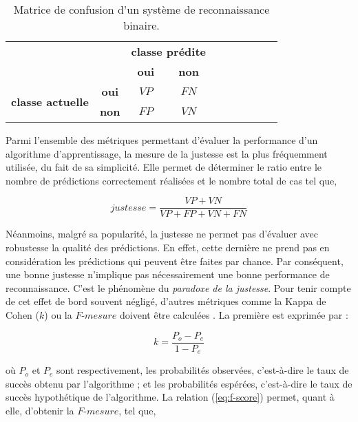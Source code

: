 \begin{table}[H]
	\begin{center}
		\caption{Matrice de confusion d'un système de reconnaissance binaire.}
		\label{tab:conf_mat}
		\begin{tabular}{llllllllll}
			\cline{3-4}
			& \multicolumn{1}{l|}{} & \multicolumn{2}{c|}{\textbf{classe prédite}} \\ \cline{3-4}
	        & \multicolumn{1}{l|}{} & \multicolumn{1}{c|}{\textbf{oui}} & \multicolumn{1}{c|}{\textbf{non}} \\ \cline{1-4}
			\multicolumn{1}{|c|}{\multirow{2}{*}{\textbf{classe actuelle}}} & \multicolumn{1}{c|}{\textbf{oui}} & \multicolumn{1}{c|}{$VP$} & \multicolumn{1}{c|}{$FN$} \\ \cline{2-4}
			\multicolumn{1}{|c|}{} & \multicolumn{1}{c|}{\textbf{non}} & \multicolumn{1}{c|}{$FP$} & \multicolumn{1}{c|}{$VN$} \\ \cline{1-4}
		\end{tabular}
	\end{center}
\end{table}

Parmi l'ensemble des métriques permettant d'évaluer la performance d'un algorithme d'apprentissage, la mesure de la justesse est la plus fréquemment utilisée, du fait de sa simplicité. Elle permet de déterminer le ratio entre le nombre de prédictions correctement réalisées et le nombre total de cas tel que,

\begin{equation}
	justesse = \frac{VP+VN}{VP+FP+VN+FN}
\end{equation}

Néanmoins, malgré sa popularité, la justesse ne permet pas d'évaluer avec robustesse la qualité des prédictions. En effet, cette dernière ne prend pas en considération les prédictions qui peuvent être faites par chance. Par conséquent, une bonne justesse n'implique pas nécessairement une bonne performance de reconnaissance. C'est le phénomène du \textit{paradoxe de la justesse}. Pour tenir compte de cet effet de bord souvent négligé, d'autres métriques comme la Kappa de Cohen ($k$) ou la $F\mbox{-} mesure$ doivent être calculées \citep{Ben-David2007a}. La première est exprimée par :

\begin{equation}
	\label{eq:kappa}
	k = \frac{P_o - P_e}{1 - P_e}
\end{equation}

\noindent où $P_o$ et $P_e$ sont respectivement, les probabilités observées, c'est-à-dire le taux de succès obtenu par l'algorithme ; et les probabilités espérées, c'est-à-dire le taux de succès hypothétique de l'algorithme. La relation (\ref{eq:f-score}) permet, quant à elle, d'obtenir la $F\mbox{-} mesure$, tel que,

